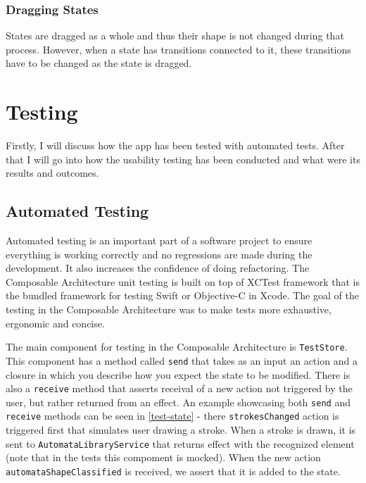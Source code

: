\subsection{Dragging States}

States are dragged as a whole and thus their shape is not changed during that process. However, when a state has transitions connected to it, these transitions have to be changed as the state is dragged.

\chapter{Testing}
\label{chap:testing}

Firstly, I will discuss how the app has been tested with automated tests. After that I will go into how the usability testing has been conducted and what were its results and outcomes.

\section{Automated Testing}

Automated testing is an important part of a software project to ensure everything is working correctly and no regressions are made during the development. It also increases the confidence of doing refactoring. The Composable Architecture unit testing is built on top of XCTest framework that is the bundled framework for testing Swift or Objective-C in Xcode. The goal of the testing in the Composable Architecture was to make tests more exhaustive, ergonomic and concise.

The main component for testing in the Composable Architecture is \lstinline{TestStore}. This component has a method called \lstinline{send} that takes as an input an action and a closure in which you describe how you expect the state to be modified. There is also a \lstinline{receive} method that asserts receival of a new action not triggered by the user, but rather returned from an effect. An example showcasing both \lstinline{send} and \lstinline{receive} methods can be seen in \ref{test-state} - there \lstinline{strokesChanged} action is triggered first that simulates user drawing a stroke. When a stroke is drawn, it is sent to \lstinline{AutomataLibraryService} that returns effect with the recognized element (note that in the tests this compoment is mocked). When the new action \lstinline{automataShapeClassified} is received, we assert that it is added to the state.

